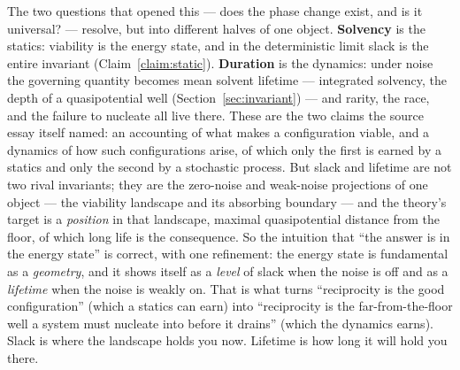 \documentclass[11pt]{article}
\theoremstyle{plain}
\theoremstyle{definition}
\begin{document}
The two questions that opened this --- does the phase change exist, and is it universal? --- resolve, but into different halves of one object. \textbf{Solvency} is the statics: viability is the energy state, and in the deterministic limit slack is the entire invariant (Claim~\ref{claim:static}). \textbf{Duration} is the dynamics: under noise the governing quantity becomes mean solvent lifetime --- integrated solvency, the depth of a quasipotential well (Section~\ref{sec:invariant}) --- and rarity, the race, and the failure to nucleate all live there. These are the two claims the source essay itself named: an accounting of what makes a configuration viable, and a dynamics of how such configurations arise, of which only the first is earned by a statics and only the second by a stochastic process. But slack and lifetime are not two rival invariants; they are the zero-noise and weak-noise projections of one object --- the viability landscape and its absorbing boundary --- and the theory's target is a \emph{position} in that landscape, maximal quasipotential distance from the floor, of which long life is the consequence. So the intuition that ``the answer is in the energy state'' is correct, with one refinement: the energy state is fundamental as a \emph{geometry}, and it shows itself as a \emph{level} of slack when the noise is off and as a \emph{lifetime} when the noise is weakly on. That is what turns ``reciprocity is the good configuration'' (which a statics can earn) into ``reciprocity is the far-from-the-floor well a system must nucleate into before it drains'' (which the dynamics earns). Slack is where the landscape holds you now. Lifetime is how long it will hold you there.
\end{document}
